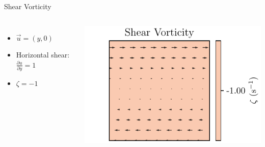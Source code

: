     \begin{frame}{Shear Vorticity}
    \begin{columns}
      \begin{itemize}
        \item \( \vec{u} = (y, 0) \)
        \item Horizontal shear: \( \frac{\partial u}{\partial y} = 1 \)
        \item \( \zeta = -1 \)
      \end{itemize}
    
      \includegraphics[width=\linewidth]{../images/vorticity_plot1.pdf}
    \end{columns}
    \end{frame}
    

